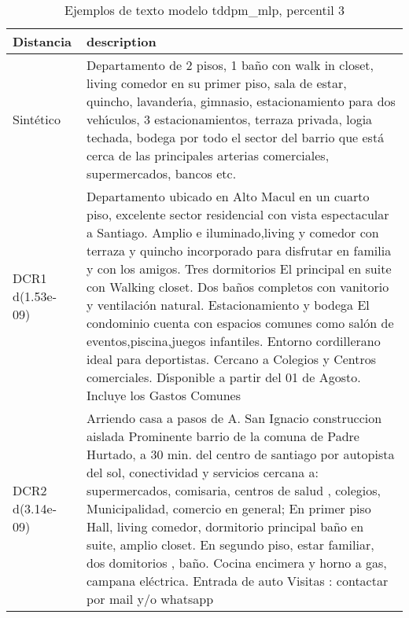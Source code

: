 \begin{table}[H]
\centering
\fontsize{10}{14}\selectfont
\caption{Ejemplos de texto modelo tddpm\_mlp, percentil 3}
\label{table-example-economicos-a-1-tddpm_mlp-3p-text}
\begin{tabular}{|l|m{35em}|}
\hline
\rowcolor[gray]{0.8}
Distancia & description \\
\hline Sintético & Departamento de 2 pisos, 1 ba\~no con walk in closet, living comedor en su primer piso, sala de estar, quincho, lavander{\'\i}a, gimnasio, estacionamiento para dos veh{\'\i}culos, 3 estacionamientos, terraza privada, logia techada, bodega por todo el sector del barrio que est\'a cerca de las principales arterias comerciales, supermercados, bancos etc. \\
\hline DCR1 d(1.53e-09) & Departamento ubicado en Alto Macul en un cuarto piso, excelente sector residencial con vista espectacular a Santiago.
Amplio e iluminado,living y comedor con terraza y quincho incorporado para disfrutar en familia y con los amigos.
Tres dormitorios El principal en suite con Walking closet.
Dos ba\~nos completos con vanitorio y ventilaci\'on natural.
Estacionamiento y bodega
El condominio cuenta con espacios comunes como sal\'on de eventos,piscina,juegos infantiles.
Entorno cordillerano ideal para deportistas.
Cercano a Colegios y Centros comerciales.
D{\'\i}sponible a partir del 01 de Agosto.
Incluye los Gastos Comunes \\
\hline DCR2 d(3.14e-09) & Arriendo casa a pasos de A. San Ignacio construccion aislada Prominente barrio de la comuna de Padre Hurtado, a 30 min. del centro de santiago por autopista del sol, conectividad y servicios cercana a: supermercados, comisaria, centros de salud , colegios, Municipalidad, comercio en general; En primer piso Hall, living comedor, dormitorio principal ba\~no en suite, amplio closet. En segundo piso, estar familiar, dos domitorios , ba\~no. Cocina encimera y horno a gas, campana el\'ectrica. Entrada de auto Visitas : contactar por mail y/o whatsapp \\
\hline
\end{tabular}
\end{table}
